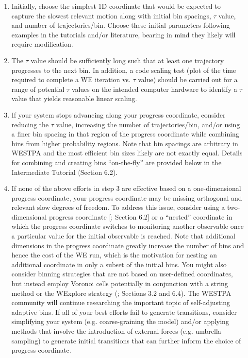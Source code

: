 \documentclass[9pt,tutorial,pubversion]{livecoms}
\begin{document}
\begin{enumerate}
\item Initially, choose the simplest 1D coordinate that would be expected to capture the slowest relevant motion along with initial bin spacings, $\tau$ value, and number of trajectories/bin. 
Choose these initial parameters following examples in the tutorials and/or literature, bearing in mind they likely will require modification.
\item The $\tau$ value should be sufficiently long such that at least one trajectory progresses to the next bin. 
In addition, a code scaling test (plot of the time required to complete a WE iteration vs. $\tau$ value) should be carried out for a range of potential $\tau$ values on the intended computer hardware to identify a $\tau$ value that yields reasonable linear scaling. 
\item If your system stops advancing along your progress coordinate, consider reducing the $\tau$ value, increasing the number of trajectories/bin, and/or using a finer bin spacing in that region of the progress coordinate while combining bins from higher probability regions. 
Note that bin spacings are arbitrary in WESTPA and the most efficient bin sizes likely are not exactly equal. 
Details for combining and creating bins “on-the-fly” are provided below in the Intermediate Tutorial (Section 6.2). 
\item If none of the above efforts in step 3 are effective based on a one-dimensional progress coordinate, your progress coordinate may be missing orthogonal and relevant slow degrees of freedom. 
To address this issue, consider using a two-dimensional progress coordinate [\citep{Saglam2019,Zwier2016}; Section 6.2] or a “nested” coordinate in which the progress coordinate switches to monitoring another observable once a particular value for the initial observable is reached. 
Note that additional dimensions in the progress coordinate greatly increase the number of bins and hence the cost of the WE run, which is the motivation for nesting an additional coordinate in only a subset of the initial bins. 
You might also consider binning strategies that are not based on user-defined coordinates, but instead employ Voronoi cells potentially in conjunction with a string method or the WExplore strategy (\citep{Dickson2014}; Sections 3.2 and 6.4). 
The WESTPA community will continue researching the important topic of self-adjusting adaptive bins. 
If all of your best efforts fail to generate transitions, consider simplifying your system (e.g. coarse-graining the model) and/or applying methods that involve the introduction of external forces (e.g. umbrella sampling) to generate initial transitions that can further inform the choice of progress coordinate.
\end{enumerate}
\end{document}
